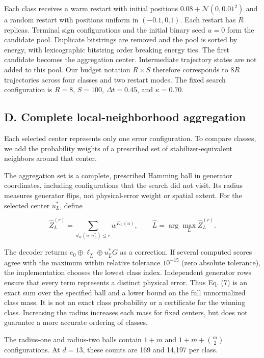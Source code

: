 \documentclass[
  10pt,
]{article}
\begin{document}
Each class receives a warm restart with initial positions
\(0.08+\mathcal N(0,0.01^2)\) and a random restart with positions
uniform in \((-0.1,0.1)\). Each restart has \(R\) replicas. Terminal
sign configurations and the initial binary seed \(u=0\) form the
candidate pool. Duplicate bitstrings are removed and the pool is sorted
by energy, with lexicographic bitstring order breaking energy ties. The
first candidate becomes the aggregation center. Intermediate trajectory
states are not added to this pool. Our budget notation \(R\times S\)
therefore corresponds to \(8R\) trajectories across four classes and two
restart modes. The fixed search configuration is \(R=8\), \(S=100\),
\(\Delta t=0.45\), and \(\kappa=0.70\).

\subsection{D. Complete local-neighborhood
aggregation}\label{d.-complete-local-neighborhood-aggregation}

Each selected center represents only one error configuration. To compare
classes, we add the probability weights of a prescribed set of
stabilizer-equivalent neighbors around that center.

The aggregation set is a complete, prescribed Hamming ball in generator
coordinates, including configurations that the search did not visit. Its
radius measures generator flips, not physical-error weight or spatial
extent. For the selected center \(u_L^*\), define

\[
\widehat Z_L^{(r)}=
\sum_{d_H(u,u_L^*)\le r} w^{E_L(u)},
\qquad \widehat L=\arg\max_L\widehat Z_L^{(r)}.
\tag{7}\label{eq:7}
\]

The decoder returns
\(e_0\oplus\ell_{\widehat L}\oplus u_{\widehat L}^*G\) as a correction.
If several computed scores agree with the maximum within relative
tolerance \(10^{-15}\) (zero absolute tolerance), the implementation
chooses the lowest class index. Independent generator rows ensure that
every term represents a distinct physical error. Thus Eq. (7) is an
exact sum over the specified ball and a lower bound on the full
unnormalized class mass. It is not an exact class probability or a
certificate for the winning class. Increasing the radius increases each
mass for fixed centers, but does not guarantee a more accurate ordering
of classes.

The radius-one and radius-two balls contain \(1+m\) and
\(1+m+\binom m2\) configurations. At \(d=13\), these counts are 169 and
14,197 per class.
\end{document}
